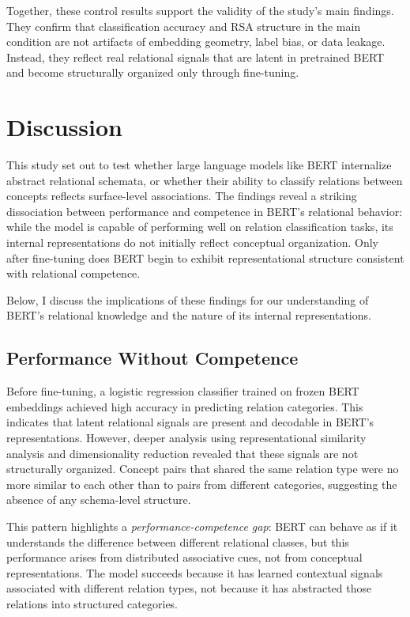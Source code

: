 \documentclass[stu,floatsintext]{apa7}
\begin{document}
Together, these control results support the validity of the study's main findings. They confirm that classification accuracy and RSA structure in the main condition are not artifacts of embedding geometry, label bias, or data leakage. Instead, they reflect real relational signals that are latent in pretrained BERT and become structurally organized only through fine-tuning.

\section{Discussion}

This study set out to test whether large language models like BERT internalize abstract relational schemata, or whether their ability to classify relations between concepts reflects surface-level associations. The findings reveal a striking dissociation between performance and competence in BERT’s relational behavior: while the model is capable of performing well on relation classification tasks, its internal representations do not initially reflect conceptual organization. Only after fine-tuning does BERT begin to exhibit representational structure consistent with relational competence.

Below, I discuss the implications of these findings for our understanding of BERT's relational knowledge and the nature of its internal representations.

\subsection{Performance Without Competence}

Before fine-tuning, a logistic regression classifier trained on frozen BERT embeddings achieved high accuracy in predicting relation categories. This indicates that latent relational signals are present and decodable in BERT's representations. However, deeper analysis using representational similarity analysis and dimensionality reduction revealed that these signals are not structurally organized. Concept pairs that shared the same relation type were no more similar to each other than to pairs from different categories, suggesting the absence of any schema-level structure.

This pattern highlights a \textit{performance-competence gap}: BERT can behave as if it understands the difference between different relational classes, but this performance arises from distributed associative cues, not from conceptual representations. The model succeeds because it has learned contextual signals associated with different relation types, not because it has abstracted those relations into structured categories.
\end{document}
